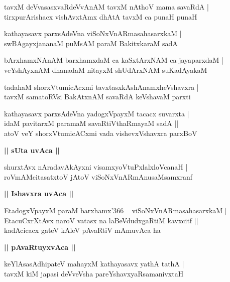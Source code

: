 \documentclass[twoside,12pt,openright]{book}
\newcounter{shloka}[chapter]
\def\uvaca#1{\centerline{{\large\textbf{#1}}}}
\begin{document}
\begin{shloka}%
tavxM deVvasasxvaRdeVvAnAM tavxM nAthoV mama savaRdA |\\
tirxpurArishacx vishAvxtAmx dhAtA tavxM ca punaH punaH 
\end{shloka}

\begin{shloka}%
kathayasavx parxsAdeVna viSoNxVnARmasahasarxkaM |\\
swBAgayxjananaM puMsAM paraM BakitxkaraM sadA
\end{shloka}

\begin{shloka}%
bArxhamxNAnAM barxhamxdaM ca kaSxtArxNAM ca jayaparxdaM |\\
veYshAyxnAM dhanadaM nitayxM shUdArxNAM suKadAyakaM 
\end{shloka}

\begin{shloka}%
tadahaM shorxVtumicAcxmi tavxtasxkAshAnamxheVshavxra |\\
tavxM samatoRVsi BakAtxnAM savaRdA keVshavaM parxti
\end{shloka}

\begin{shloka}%
kathayasavx parxsAdeVna yadogxVpayxM tacacx suvarxta |\\
idaM pavitarxM paramaM savaRtiVthaRmayaM sadA ||\\
atoV veY shorxVtumicACxmi vada vishevxVshavxra parxBoV
\end{shloka}

\uvaca{|| sUta uvAca ||}

\begin{shloka}%
shurxtAvx nAradavAkAyxni visamxyoVtuPxlalxloVcanaH |\\
roVmAMcitasatxtoV jAtoV viSoNxVnARmAnusaMsamxranf
\end{shloka}

\uvaca{|| Ishavxra uvAca ||}

\begin{shloka}%
EtadogxVpayxM paraM barxhamx\char'366 ~ viSoNxVnARmasahasarxkaM |\\
EtacuCxrXtAvx naroV vatasx na laBeVdudxgaRtiM kavxcitf ||\\
kadAcicacx gateV kAleV pAvaRtiV mAmuvAca ha 
\end{shloka}

\uvaca{|| pAvaRtuyxvAca ||}

\begin{shloka}%
keYlAsasAdhipateV mahayxM kathayasavx yathA tathA |\\
tavxM kiM japasi deVveVsha pareYshavxyaRsamanivxtaH 
\end{shloka}
\end{document}

